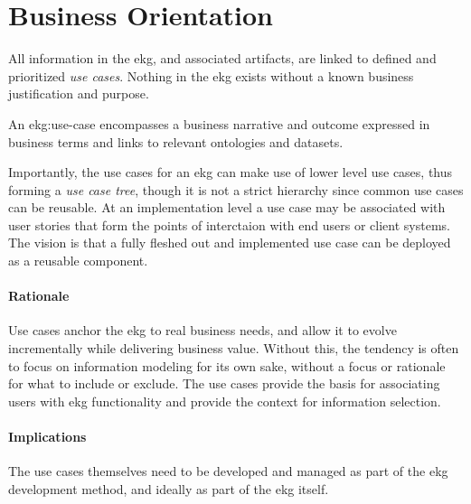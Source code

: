 \section{Business Orientation}\label{sec:ekg-principle-business-orientation}

All information in the \gls{ekg}, and associated artifacts, 
are linked to defined and prioritized \textit{use cases}.
Nothing in the \gls{ekg} exists without a known business justification and purpose.

An \gls{ekg:use-case} encompasses a business narrative and outcome expressed in
business terms and links to relevant ontologies and \glspl{dataset}.

Importantly, the use cases for an \gls{ekg} can make use of lower level use cases, 
thus forming a \textit{use case tree}, though it is not a strict hierarchy 
since common use cases can be reusable. 
At an implementation level a use case may be associated with user stories that 
form the points of interctaion with end users or client systems.
The vision is that a fully fleshed out and implemented use case can be deployed as a reusable component.

\paragraph{Rationale}

Use cases anchor the \gls{ekg} to real business needs, and allow it to 
evolve incrementally while delivering business value. 
Without this, the tendency is often to focus on information modeling for its own sake, 
without a focus or rationale for what to include or exclude.
The use cases provide the basis for associating users with \gls{ekg} functionality 
and provide the context for information selection.

\paragraph{Implications}

The use cases themselves need to be developed and managed as part of the \gls{ekg} development method, 
and ideally as part of the \gls{ekg} itself.
